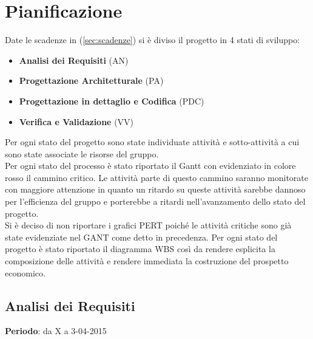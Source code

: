 \section{Pianificazione}{
	Date le scadenze in (\ref{sec:scadenze}) si \`{e} diviso il progetto in 4 stati di sviluppo:
	\begin{itemize}
		\item \textbf{Analisi dei Requisiti} (AN)
		\item \textbf{Progettazione Architetturale} (PA)
		\item \textbf{Progettazione in dettaglio e Codifica} (PDC)
		\item \textbf{Verifica e Validazione} (VV)
	\end{itemize}
	
	Per ogni stato del progetto sono state individuate attivit\`{a} e sotto-attivit\`{a} a cui sono state associate le risorse del gruppo.\\
	Per ogni stato del processo \`{e} stato riportato il Gantt con evidenziato in colore rosso il cammino critico. Le attivit\`{a} parte di questo cammino saranno monitorate con maggiore attenzione in quanto un ritardo su queste attivit\`{a}	sarebbe dannoso per l'efficienza del gruppo e porterebbe a ritardi nell'avanzamento dello stato del progetto.\\
	Si \`{e} deciso di non riportare i grafici PERT poich\'{e} le attivit\`{a} critiche sono gi\`{a} state evidenziate nel GANT come detto in precedenza.
	Per ogni stato del progetto \`{e} stato riportato il diagramma WBS cos\`{i} da rendere esplicita la composizione delle attivit\`{a} e rendere immediata la costruzione del prospetto economico.
	
\subsection{Analisi dei Requisiti}{
	\textbf{Periodo}: da X a 3-04-2015 \\
	
}}

